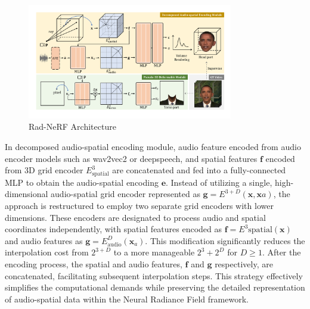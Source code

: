 \begin{figure}    
    \centering
    \includegraphics[width=0.8\textwidth]{figures/figure_chap_2/radnerf.pdf}
    \caption{Rad-NeRF Architecture}
    \label{fig:Rad-NeRF}
\end{figure} 

In decomposed audio-spatial encoding module, audio feature encoded from audio encoder models such as wav2vec2 or deepspeech, \cite{hjortnaes:2020, baevski2020wav2vec} and spatial features $\mathbf{f}$ encoded from 3D grid encoder $E^3_\text{spatial}$ are concatenated and fed into a fully-connected MLP to obtain the audio-spatial encoding $\mathbf{e}$.
Instead of utilizing a single, high-dimensional audio-spatial grid encoder represented as $\mathbf{g} = E^{3+D} (\mathbf{x}, \mathbf{x}a)$, the approach is restructured to employ two separate grid encoders with lower dimensions. These encoders are designated to process audio and spatial coordinates independently, with spatial features encoded as $\mathbf{f} = E^3\text{spatial} (\mathbf{x})$ and audio features as $\mathbf{g} = E^D_\text{audio} (\mathbf{x}_a)$. This modification significantly reduces the interpolation cost from $2^{3 + D}$ to a more manageable $2^3 + 2^D$ for $D \ge 1$. After the encoding process, the spatial and audio features, $\mathbf{f}$ and $\mathbf{g}$ respectively, are concatenated, facilitating subsequent interpolation steps. This strategy effectively simplifies the computational demands while preserving the detailed representation of audio-spatial data within the Neural Radiance Field framework.

